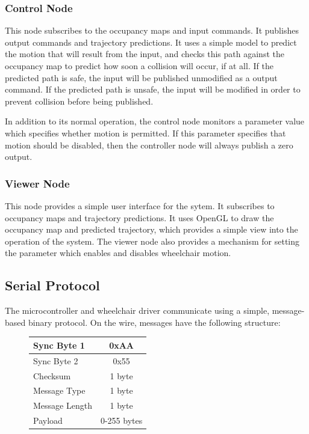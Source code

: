 \documentclass[oneside,final,a4paper]{report}
\begin{document}
\subsubsection{Control Node}
This node subscribes to the occupancy maps and input commands.  It publishes output commands and trajectory predictions.  It uses a simple model to predict the motion that will result from the input, and checks this path against the occupancy map to predict how soon a collision will occur, if at all.  If the predicted path is safe, the input will be published unmodified as a output command.  If the predicted path is unsafe, the input will be modified in order to prevent collision before being published.

In addition to its normal operation, the control node monitors a parameter value which specifies whether motion is permitted.  If this parameter specifies that motion should be disabled, then the controller node will always publish a zero output.

\subsubsection{Viewer Node}
This node provides a simple user interface for the sytem.  It subscribes to occupancy maps and trajectory predictions.  It uses OpenGL to draw the occupancy map and predicted trajectory, which provides a simple view into the operation of the system.  The viewer node also provides a mechanism for setting the parameter which enables and disables wheelchair motion.

\subsection{Serial Protocol}
The microcontroller and wheelchair driver communicate using a simple, message-based binary protocol.  On the wire, messages have the following structure:

\begin{figure}[hbt]
 \centering
 \begin{tabular}{|l|c|}
  \hline
   Sync Byte 1 & 0xAA \\ \hline
   Sync Byte 2 & 0x55 \\ \hline
   Checksum & 1 byte \\ \hline
   Message Type & 1 byte \\ \hline
   Message Length & 1 byte \\ \hline
   Payload & 0-255 bytes \\ \hline
 \end{tabular}
\end{figure}
\end{document}
